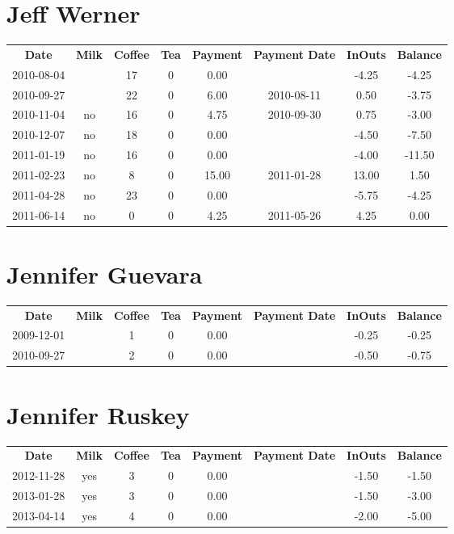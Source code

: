 \section{Jeff Werner}

\begin{center}
\begin{tabular}{cccccccc}
\textbf{Date} & \textbf{Milk} & \textbf{Coffee} & \textbf{Tea} & \textbf{Payment} & \textbf{Payment Date} & \textbf{InOuts} & \textbf{Balance} \\
2010-08-04 &  & 17 & 0 &  0.00 &  & -4.25 &  -4.25\\ 
2010-09-27 &  & 22 & 0 &  6.00 & 2010-08-11 &  0.50 &  -3.75\\ 
2010-11-04 & no & 16 & 0 &  4.75 & 2010-09-30 &  0.75 &  -3.00\\ 
2010-12-07 & no & 18 & 0 &  0.00 &  & -4.50 &  -7.50\\ 
2011-01-19 & no & 16 & 0 &  0.00 &  & -4.00 & -11.50\\ 
2011-02-23 & no &  8 & 0 & 15.00 & 2011-01-28 & 13.00 &   1.50\\ 
2011-04-28 & no & 23 & 0 &  0.00 &  & -5.75 &  -4.25\\ 
2011-06-14 & no &  0 & 0 &  4.25 & 2011-05-26 &  4.25 &   0.00
\end{tabular}
\end{center}

\section{Jennifer Guevara}

\begin{center}
\begin{tabular}{cccccccc}
\textbf{Date} & \textbf{Milk} & \textbf{Coffee} & \textbf{Tea} & \textbf{Payment} & \textbf{Payment Date} & \textbf{InOuts} & \textbf{Balance} \\
2009-12-01 &  & 1 & 0 & 0.00 &  & -0.25 & -0.25\\ 
2010-09-27 &  & 2 & 0 & 0.00 &  & -0.50 & -0.75
\end{tabular}
\end{center}

\section{Jennifer Ruskey}

\begin{center}
\begin{tabular}{cccccccc}
\textbf{Date} & \textbf{Milk} & \textbf{Coffee} & \textbf{Tea} & \textbf{Payment} & \textbf{Payment Date} & \textbf{InOuts} & \textbf{Balance} \\
2012-11-28 & yes & 3 & 0 & 0.00 &  & -1.50 & -1.50\\ 
2013-01-28 & yes & 3 & 0 & 0.00 &  & -1.50 & -3.00\\ 
2013-04-14 & yes & 4 & 0 & 0.00 &  & -2.00 & -5.00
\end{tabular}
\end{center}

